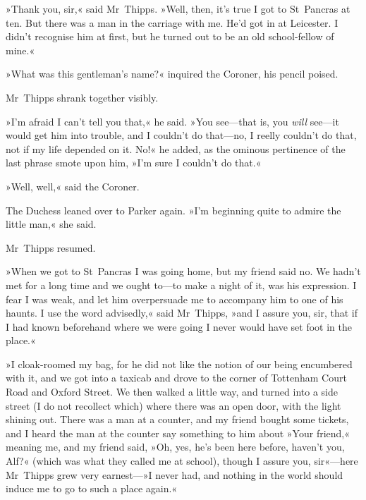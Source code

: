 »Thank you, sir,« said Mr~Thipps. »Well, then, it's true I got to St~Pancras at ten. But there was a man in the carriage with me. He'd got in at Leicester. I didn't recognise him at first, but he turned out to be an old school-fellow of mine.«

»What was this gentleman's name?« inquired the Coroner, his pencil poised.

Mr~Thipps shrank together visibly.

»I'm afraid I can't tell you that,« he said. »You see—that is, you \textit{will} see—it would get him into trouble, and I couldn't do that—no, I reelly couldn't do that, not if my life depended on it. No!« he added, as the ominous pertinence of the last phrase smote upon him, »I'm sure I couldn't do that.«

»Well, well,« said the Coroner.

The Duchess leaned over to Parker again. »I'm beginning quite to admire the little man,« she said.

Mr~Thipps resumed.

»When we got to St~Pancras I was going home, but my friend said no. We hadn't met for a long time and we ought to—to make a night of it, was his expression. I fear I was weak, and let him overpersuade me to accompany him to one of his haunts. I use the word advisedly,« said Mr~Thipps, »and I assure you, sir, that if I had known beforehand where we were going I never would have set foot in the place.«

»I cloak-roomed my bag, for he did not like the notion of our being encumbered with it, and we got into a taxicab and drove to the corner of Tottenham Court Road and Oxford Street. We then walked a little way, and turned into a side street (I do not recollect which) where there was an open door, with the light shining out. There was a man at a counter, and my friend bought some tickets, and I heard the man at the counter say something to him about »Your friend,« meaning me, and my friend said, »Oh, yes, he's been here before, haven't you, Alf?« (which was what they called me at school), though I assure you, sir«---here Mr~Thipps grew very earnest---»I never had, and nothing in the world should induce me to go to such a place again.«

